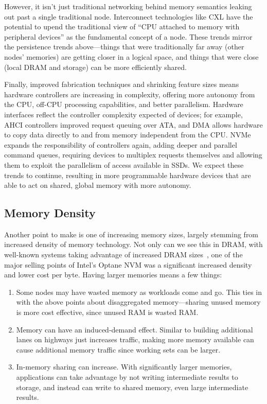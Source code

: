 However, it isn't just traditional networking behind memory semantics leaking out past a single traditional node. Interconnect technologies like CXL have the potential to upend the
traditional view of ``CPU attached to memory with peripheral devices'' as the fundamental concept of a node. These trends mirror the persistence trends above---things that were traditionally far away (other nodes' memories) are getting closer in a logical space, and
things that were close (local DRAM and storage) can be more efficiently shared.

Finally, improved fabrication techniques and shrinking feature
sizes means hardware controllers are increasing in complexity, offering more autonomy from the CPU,
off-CPU processing capabilities, and better parallelism. Hardware interfaces reflect the controller
complexity expected of devices; for example, AHCI controllers improved request queuing over ATA, and DMA
allows hardware to copy data directly to and from memory independent from the CPU. NVMe
expands the responsibility of controllers again, adding deeper and parallel command queues, requiring
devices to multiplex requests themselves and allowing them to exploit the parallelism of access
available in SSDs. We expect these trends to continue, resulting in more programmable hardware
devices that are able to act on shared, global memory with more autonomy.

\subsection{Memory Density}

Another point to make is one of increasing memory sizes, largely stemming from increased density of memory technology.
Not only can we see this in DRAM, with well-known systems taking advantage of
increased DRAM sizes~\cite{ousterhout15}, one of the major selling points of Intel's Optane NVM was a significant
increased density and lower cost per byte. Having larger memories means a few things:

\begin{enumerate}
    \item Some nodes may have wasted memory as workloads come and go. This ties in with the above points about
          disaggregated memory---sharing unused memory is more cost effective, since unused RAM is wasted RAM.
    \item Memory can have an induced-demand effect. Similar to building additional lanes on highways just increases
          traffic, making more memory available can cause additional memory traffic since working sets can be larger.
    \item In-memory sharing can increase. With significantly larger memories, applications can take advantage by not
          writing intermediate results to storage, and instead can write to shared memory, even large intermediate results.
\end{enumerate}

